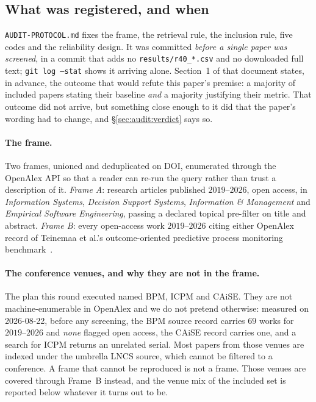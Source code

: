 \documentclass[preprint,12pt]{elsarticle}
\begin{document}
\subsection{What was registered, and when}
\label{sec:audit:reg}

\texttt{AUDIT-PROTOCOL.md} fixes the frame, the retrieval rule, the inclusion
rule, five codes and the reliability design. It was committed \emph{before a
single paper was screened}, in a commit that adds no
\texttt{results/r40\_*.csv} and no downloaded full text; \texttt{git log
--stat} shows it arriving alone. Section~1 of that document states, in
advance, the outcome that would refute this paper's premise: a majority of
included papers stating their baseline \emph{and} a majority justifying their
metric. That outcome did not arrive, but something close enough to it did that
the paper's wording had to change, and \S\ref{sec:audit:verdict} says so.

\paragraph{The frame.} Two frames, unioned and deduplicated on DOI, enumerated
through the OpenAlex API so that a reader can re-run the query rather than
trust a description of it. \emph{Frame A}: research articles published
$2019$--$2026$, open access, in \emph{Information Systems}, \emph{Decision
Support Systems}, \emph{Information \& Management} and \emph{Empirical
Software Engineering}, passing a declared topical pre-filter on title and
abstract. \emph{Frame B}: every open-access work $2019$--$2026$ citing either
OpenAlex record of Teinemaa et al.'s outcome-oriented predictive process
monitoring benchmark~\citep{teinemaa2019outcome}.

\paragraph{The conference venues, and why they are not in the frame.} The plan
this round executed named BPM, ICPM and CAiSE. They are not machine-enumerable
in OpenAlex and we do not pretend otherwise: measured on 2026-08-22, before any
screening, the BPM source record carries $69$ works for $2019$--$2026$ and
\emph{none} flagged open access, the CAiSE record carries one, and a search
for ICPM returns an unrelated serial. Most papers from those venues are
indexed under the umbrella LNCS source, which cannot be filtered to a
conference. A frame that cannot be reproduced is not a frame. Those venues
are covered through Frame~B instead, and the venue mix of the included set is
reported below whatever it turns out to be.
\end{document}
